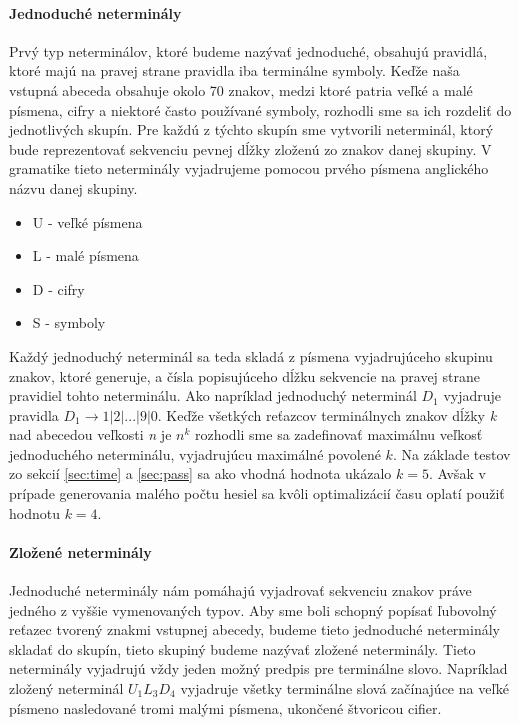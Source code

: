 \paragraph{Jednoduché neterminály}
Prvý typ neterminálov, ktoré budeme nazývať jednoduché, obsahujú pravidlá, ktoré majú na pravej strane pravidla iba terminálne symboly. Keďže naša vstupná abeceda obsahuje okolo 70 znakov, medzi ktoré patria veľké a malé písmena, cifry a niektoré často používané symboly, rozhodli sme sa ich rozdeliť do jednotlivých skupín. Pre každú z týchto skupín sme vytvorili neterminál, ktorý bude reprezentovať sekvenciu pevnej dĺžky zloženú zo znakov danej skupiny. V gramatike tieto neterminály vyjadrujeme pomocou prvého písmena anglického názvu danej skupiny.
\begin{itemize}
	\item U - veľké písmena
	\item L - malé písmena
	\item D - cifry
	\item S - symboly
\end{itemize}
Každý jednoduchý neterminál sa teda skladá z písmena vyjadrujúceho skupinu znakov, ktoré generuje, a čísla popisujúceho dĺžku sekvencie na pravej strane pravidiel tohto neterminálu. Ako napríklad jednoduchý neterminál \(D_1\) vyjadruje pravidla \(D_1 \to 1 | 2 | ... | 9 | 0 \). Keďže všetkých reťazcov terminálnych znakov dĺžky \emph{k} nad abecedou veľkosti \emph{n} je \( n^k\) rozhodli sme sa zadefinovať maximálnu veľkosť jednoduchého neterminálu, vyjadrujúcu maximálné povolené \(k\). Na základe testov zo sekcií \ref{sec:time} a \ref{sec:pass} sa ako vhodná hodnota ukázalo \(k = 5\). Avšak v prípade generovania malého počtu hesiel sa kvôli optimalizácií času oplatí použiť hodnotu \(k = 4\).

\paragraph{Zložené neterminály}
Jednoduché neterminály nám pomáhajú vyjadrovať sekvenciu znakov práve jedného z vyššie vymenovaných typov. Aby sme boli schopný popísať ľubovolný reťazec tvorený znakmi vstupnej abecedy, budeme tieto jednoduché neterminály skladať do skupín, tieto skupiný budeme nazývať zložené neterminály. Tieto neterminály vyjadrujú vždy jeden možný predpis pre terminálne slovo. Napríklad zložený neterminál \(U_1L_3D_4\) vyjadruje všetky terminálne slová začínajúce na veľké písmeno nasledované tromi malými písmena, ukončené štvoricou cifier.

